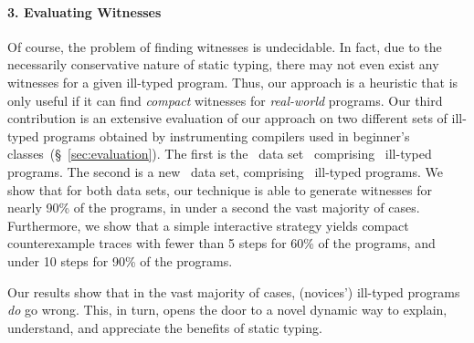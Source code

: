 \paragraph{3. Evaluating Witnesses}
%
Of course, the problem of finding witnesses is
undecidable. In fact, due to the necessarily
conservative nature of static typing, there
may not even exist any witnesses for a given
ill-typed program.
%
Thus, our approach is a heuristic that is only useful
if it can find \emph{compact} witnesses for
\emph{real-world} programs.
%
Our third contribution is an extensive evaluation of our approach
on two different sets of ill-typed programs obtained by instrumenting
compilers used in beginner's classes~(\S~\ref{sec:evaluation}).
%
The first is the \uwbench\ data set~\cite{lerner_searching_2007}
comprising \uwsize\ ill-typed programs.
%
The second is a new \ucsdbench\ data set, comprising \ucsdsize\
ill-typed programs.
%
We show that for both data sets, our technique is able to generate
witnesses for nearly 90\% of the programs, in under a second the
vast majority of cases.
%
Furthermore, we show that a simple interactive strategy yields
compact counterexample traces with fewer than 5 steps for 60\%
of the programs, and under 10 steps for 90\% of the programs.

\smallskip
Our results show that in the vast majority of
cases, (novices') ill-typed programs \emph{do} go wrong.
This, in turn, opens the door to a novel dynamic way to
explain, understand, and appreciate the benefits of static typing.

